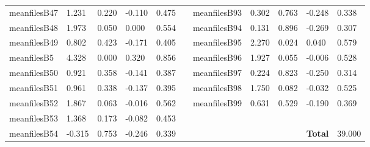 \begin{table}[h!]
\begin{tabular}{lllllllllll}
meanfilesB47  & 1.231            & 0.220            & -0.110              & 0.475               &           & meanfilesB93  & 0.302            & 0.763            & -0.248              & 0.338               \\
meanfilesB48  & 1.973            & 0.050            & 0.000               & 0.554               &           & meanfilesB94  & 0.131            & 0.896            & -0.269              & 0.307               \\
meanfilesB49  & 0.802            & 0.423            & -0.171              & 0.405               &           & meanfilesB95  & 2.270            & 0.024            & 0.040               & 0.579               \\
meanfilesB5   & 4.328            & 0.000            & 0.320               & 0.856               &           & meanfilesB96  & 1.927            & 0.055            & -0.006              & 0.528               \\
meanfilesB50  & 0.921            & 0.358            & -0.141              & 0.387               &           & meanfilesB97  & 0.224            & 0.823            & -0.250              & 0.314               \\
meanfilesB51  & 0.961            & 0.338            & -0.137              & 0.395               &           & meanfilesB98  & 1.750            & 0.082            & -0.032              & 0.525               \\
meanfilesB52  & 1.867            & 0.063            & -0.016              & 0.562               &           & meanfilesB99  & 0.631            & 0.529            & -0.190              & 0.369               \\ \cline{7-11} 
meanfilesB53  & 1.368            & 0.173            & -0.082              & 0.453               &           &               &                  &                  &                     &                     \\
meanfilesB54  & -0.315           & 0.753            & -0.246              & 0.339               &           &               &                  &                  & \textbf{Total}      & 39.000             
\end{tabular}
\end{table}

